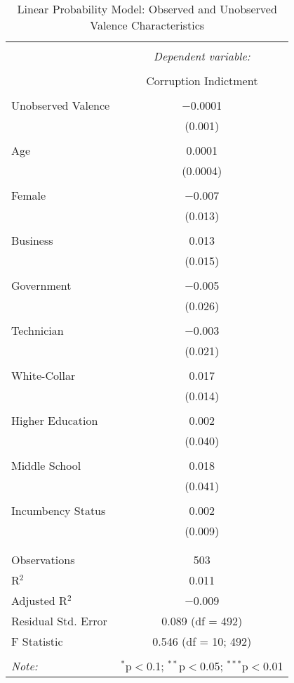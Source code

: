 \documentclass{article}
\begin{document}
\begin{table}[!htbp] \centering 
  \caption{Linear Probability Model: Observed and Unobserved Valence Characteristics} 
  \label{} 
\begin{tabular}{@{\extracolsep{5pt}}lc} 
\\[-1.8ex]\hline 
\hline \\[-1.8ex] 
 & \multicolumn{1}{c}{\textit{Dependent variable:}} \\ 
\cline{2-2} 
\\[-1.8ex] & Corruption Indictment \\ 
\hline \\[-1.8ex] 
 Unobserved Valence & $-$0.0001 \\ 
  & (0.001) \\ 
  & \\ 
 Age & 0.0001 \\ 
  & (0.0004) \\ 
  & \\ 
 Female & $-$0.007 \\ 
  & (0.013) \\ 
  & \\ 
 Business & 0.013 \\ 
  & (0.015) \\ 
  & \\ 
 Government & $-$0.005 \\ 
  & (0.026) \\ 
  & \\ 
 Technician & $-$0.003 \\ 
  & (0.021) \\ 
  & \\ 
 White-Collar & 0.017 \\ 
  & (0.014) \\ 
  & \\ 
 Higher Education & 0.002 \\ 
  & (0.040) \\ 
  & \\ 
 Middle School & 0.018 \\ 
  & (0.041) \\ 
  & \\ 
 Incumbency Status & 0.002 \\ 
  & (0.009) \\ 
  & \\ 
\hline \\[-1.8ex] 
Observations & 503 \\ 
R$^{2}$ & 0.011 \\ 
Adjusted R$^{2}$ & $-$0.009 \\ 
Residual Std. Error & 0.089 (df = 492) \\ 
F Statistic & 0.546 (df = 10; 492) \\ 
\hline 
\hline \\[-1.8ex] 
\textit{Note:}  & \multicolumn{1}{r}{$^{*}$p$<$0.1; $^{**}$p$<$0.05; $^{***}$p$<$0.01} \\ 
\end{tabular} 
\end{table} 
\end{document}
